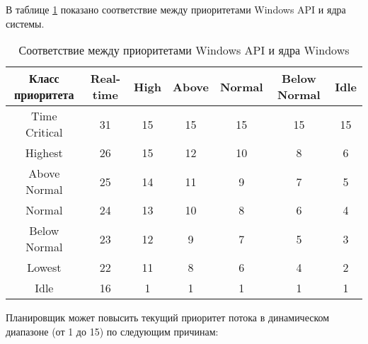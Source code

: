 В таблице \ref{tbl:prioritet} показано соответствие между приоритетами Windows API и ядра системы.

\FloatBarrier
\begin{table}[h]
	\begin{center}
        \begin{threeparttable} \captionsetup{justification=raggedright,singlelinecheck=off}
		\caption{\label{tbl:prioritet} Соответствие между приоритетами Windows API и ядра Windows}
		\begin{tabular}{|c|c|c|c|c|c|c|}
            \hline
            Класс приоритета & Real-time & High & Above &
            Normal & Below Normal & Idle \\ \hline
            Time Critical & 31 & 15 & 15 & 15 & 15 & 15 \\ \hline
            Highest & 26 & 15 & 12 & 10 & 8 & 6 \\ \hline
            Above Normal & 25 & 14 & 11 & 9 & 7 & 5 \\ \hline
            Normal & 24 & 13 & 10 & 8 & 6 & 4 \\ \hline
            Below Normal & 23 & 12 & 9 & 7 & 5 & 3 \\ \hline
            Lowest & 22 & 11 & 8 & 6 & 4 & 2 \\ \hline
            Idle & 16 & 1 & 1 & 1 & 1 & 1 \\ \hline
		\end{tabular}
        \end{threeparttable}
	\end{center}
\end{table}
\FloatBarrier

Планировщик может повысить текущий приоритет потока в динамическом диапазоне (от 1 до 15) по следующим причинам:

